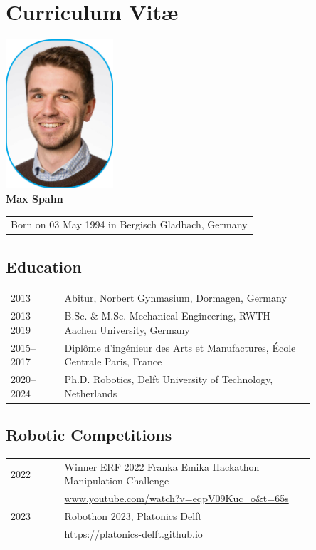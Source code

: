 \chapter*{Curriculum Vit\ae}
\begin{center}
    \includegraphics[width=0.3\textwidth]{src/helpers/cv/max_spahn.png}\\
    \vspace{0.5cm}
    {\Large\textbf{Max Spahn}} \\
    \vspace{0.2cm}
    \begin{tabular}{c}
        Born on 03 May 1994 in Bergisch Gladbach, Germany
    \end{tabular}
\end{center}

\section*{Education}

\begin{tabular}{p{0.15\linewidth} p{0.7\linewidth}}
  2013 & Abitur, Norbert Gynmasium, Dormagen, Germany\\
    2013--2019 & B.Sc. \& M.Sc. Mechanical Engineering, RWTH Aachen University, Germany\\
    2015--2017 & Diplôme d'ingénieur des Arts et Manufactures, École Centrale Paris, France\\
    2020--2024 & Ph.D. Robotics, Delft University of Technology, Netherlands \\
\end{tabular}

\section*{Robotic Competitions}
\begin{tabular}{p{0.15\linewidth} p{0.7\linewidth}}
  2022 & Winner ERF 2022 Franka Emika Hackathon Manipulation
  Challenge\\
  & \url{www.youtube.com/watch?v=eqpV09Kuc_o&t=65s} \\
  2023 & Robothon 2023, Platonics Delft \\
  & \url{https://platonics-delft.github.io} \\
\end{tabular}
